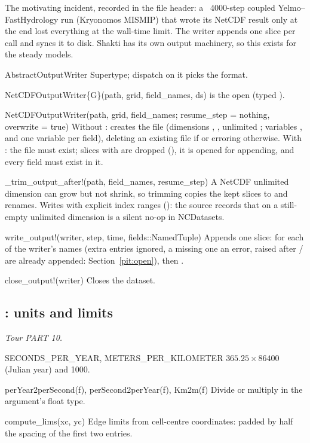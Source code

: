 The motivating incident, recorded in the file header: a ~4000-step coupled Yelmo--FastHydrology run (Kryonomos MISMIP) that
wrote its NetCDF result only at the end lost everything at the wall-time limit. The writer appends one slice per call
and syncs it to disk. Shakti has its own output machinery, so this exists for the steady models.
\begin{fnlist}
\item[AbstractOutputWriter] Supertype; dispatch on it picks the format.
\item[NetCDFOutputWriter\{G\}(path, grid, field\_names, ds)]  is the open  (typed ).
\item[NetCDFOutputWriter(path, grid, field\_names; resume\_step = nothing, overwrite = true)] Without : creates the
  file (dimensions , , unlimited ; variables ,  and one  variable per field),
  deleting an existing file if  or erroring otherwise. With : the file must exist; slices with
   are dropped (), it is opened for appending, and every field must exist in it.
\item[\_trim\_output\_after!(path, field\_names, resume\_step)] A NetCDF unlimited dimension can grow but not shrink, so trimming copies
  the kept slices to  and renames. Writes with explicit index ranges (): the source records
  that  on a still-empty unlimited dimension is a silent no-op in NCDatasets.
\item[write\_output!(writer, step, time, fields::NamedTuple)] Appends one slice:  for each of the writer's
  names (extra entries ignored, a missing one an error, raised after / are already appended:
  Section~\ref{pit:open}), then .
\item[close\_output!(writer)] Closes the dataset.
\end{fnlist}

\subsection{: units and limits}\label{ref:utilities}
\emph{Tour PART 10.}
\begin{fnlist}
\item[SECONDS\_PER\_YEAR, METERS\_PER\_KILOMETER] $365.25\times86400$ (Julian year) and 1000.
\item[perYear2perSecond(f), perSecond2perYear(f), Km2m(f)] Divide or multiply in the argument's float type.
\item[compute\_lims(xc, yc)] Edge limits from cell-centre coordinates:  padded by half the spacing of the first two
  entries.
\end{fnlist}

